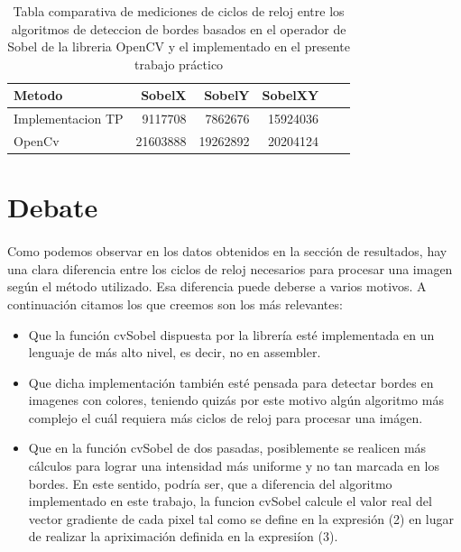 \documentclass[11pt, a4paper]{article}
\begin{document}
\begin{table}[ht] %
\centering %
\begin{tabular}{|l|r|r|r|r|r|}
\hline
Metodo & SobelX & SobelY & SobelXY \\
\hline
Implementacion TP & 9117708 & 7862676 & 15924036 \\
\hline
OpenCv & 21603888 & 19262892 & 20204124 \\
\hline



\end{tabular}

\caption{Tabla comparativa de mediciones de ciclos de reloj entre los algoritmos de deteccion de bordes basados en el operador de Sobel de la libreria OpenCV y el implementado en el presente trabajo pr\'actico} %
\label{Tiempo comparacion} %
\end{table}


\newpage
\section{Debate}
\paragraph{}
Como podemos observar en los datos obtenidos en la secci\'on de resultados, hay una clara diferencia entre los ciclos de reloj necesarios para procesar una imagen seg\'un el m\'etodo utilizado. Esa diferencia puede deberse a varios motivos. A continuaci\'on citamos los que creemos son los m\'as relevantes:

\begin{itemize}
\item Que la funci\'on cvSobel dispuesta por la librer\'ia est\'e implementada en un lenguaje de m\'as alto nivel, es decir, no en assembler.
\item Que dicha implementaci\'on tambi\'en est\'e pensada para detectar bordes en imagenes con colores, teniendo quiz\'as por este motivo alg\'un algoritmo m\'as complejo el cu\'al requiera m\'as ciclos de reloj para procesar una im\'agen.
\item Que en la funci\'on cvSobel de dos pasadas, posiblemente se realicen m\'as c\'alculos para lograr una intensidad m\'as uniforme y no tan marcada en los bordes. En este sentido, podr\'ia ser, que a diferencia del algoritmo implementado en este trabajo, la funcion cvSobel calcule el valor real del vector gradiente de cada pixel tal como se define en la expresi\'on (2) en lugar de realizar la apriximaci\'on definida en la expresi\'ion (3).

\end{itemize}
\end{document}
